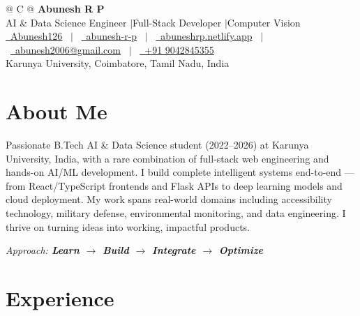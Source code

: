 \documentclass[a4paper,11pt]{article}
\begin{document}
\pagestyle{empty}

\begin{tabularx}{\linewidth}{@{} C @{}}
\Huge{\textbf{Abunesh R P}} \\[6pt]
\large{AI \& Data Science Engineer \quad$|$\quad Full-Stack Developer \quad$|$\quad Computer Vision} \\[5pt]
\href{https://github.com/Abunesh126}{\raisebox{-0.05\height}\faGithub\ Abunesh126} \
$|$ \
\href{https://linkedin.com/in/abunesh-r-p-803677278}{\raisebox{-0.05\height}\faLinkedin\ abunesh-r-p} \
$|$ \
\href{https://abuneshrp.netlify.app}{\raisebox{-0.05\height}\faGlobe\ abuneshrp.netlify.app} \
$|$ \
\href{mailto:abunesh2006@gmail.com}{\raisebox{-0.05\height}\faEnvelope\ abunesh2006@gmail.com} \
$|$ \
\href{tel:+919042845355}{\raisebox{-0.05\height}\faMobile\ +91 9042845355} \\[2pt]
\normalsize{Karunya University, Coimbatore, Tamil Nadu, India}
\end{tabularx}

\section{About Me}
Passionate B.Tech AI \& Data Science student (2022--2026) at Karunya University, India, with a rare combination of full-stack web engineering and hands-on AI/ML development. I build complete intelligent systems end-to-end — from React/TypeScript frontends and Flask APIs to deep learning models and cloud deployment. My work spans real-world domains including accessibility technology, military defense, environmental monitoring, and data engineering. I thrive on turning ideas into working, impactful products.

\textit{Approach: \textbf{Learn $\rightarrow$ Build $\rightarrow$ Integrate $\rightarrow$ Optimize}}

\section{Experience}
\end{document}
